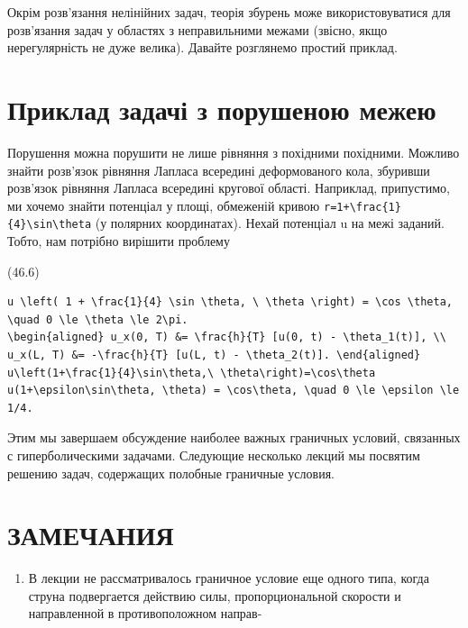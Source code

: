 \documentclass[
  ukrainian,
]{article}
\providecommand{\tightlist}{%
  \setlength{\itemsep}{0pt}\setlength{\parskip}{0pt}}
\begin{document}
Окрім розв'язання нелінійних задач, теорія збурень може
використовуватися для розв'язання задач у областях з неправильними
межами (звісно, якщо нерегулярність не дуже велика). Давайте розглянемо
простий приклад.

\section{Приклад задачі з порушеною
межею}\label{ux43fux440ux438ux43aux43bux430ux434-ux437ux430ux434ux430ux447ux456-ux437-ux43fux43eux440ux443ux448ux435ux43dux43eux44e-ux43cux435ux436ux435ux44e}

Порушення можна порушити не лише рівняння з похідними похідними. Можливо
знайти розв'язок рівняння Лапласа всередині деформованого кола, збуривши
розв'язок рівняння Лапласа всередині кругової області. Наприклад,
припустимо, ми хочемо знайти потенціал у площі, обмеженій кривою
\texttt{r=1+\textbackslash{}frac\{1\}\{4\}\textbackslash{}sin\textbackslash{}theta}
(у полярних координатах). Нехай потенціал u на межі заданий. Тобто, нам
потрібно вирішити проблему

(46.6)

\begin{verbatim}
u \left( 1 + \frac{1}{4} \sin \theta, \ \theta \right) = \cos \theta, \quad 0 \le \theta \le 2\pi.
\begin{aligned} u_x(0, T) &= \frac{h}{T} [u(0, t) - \theta_1(t)], \\ u_x(L, T) &= -\frac{h}{T} [u(L, t) - \theta_2(t)]. \end{aligned}
u\left(1+\frac{1}{4}\sin\theta,\ \theta\right)=\cos\theta
u(1+\epsilon\sin\theta, \theta) = \cos\theta, \quad 0 \le \epsilon \le 1/4.
\end{verbatim}

Этим мы завершаем обсуждение наиболее важных граничных условий,
связанных с гиперболическими задачами. Следующие несколько лекций мы
посвятим решению задач, содержащих полобные граничные условия.

\section{ЗАМЕЧАНИЯ}\label{ux437ux430ux43cux435ux447ux430ux43dux438ux44f-3}

\begin{enumerate}
\def\labelenumi{\arabic{enumi}.}
\tightlist
\item
  В лекции не рассматривалось граничное условие еще одного типа, когда
  струна подвергается действию силы, пропорциональной скорости и
  направленной в противоположном направ-
\end{enumerate}
\end{document}
